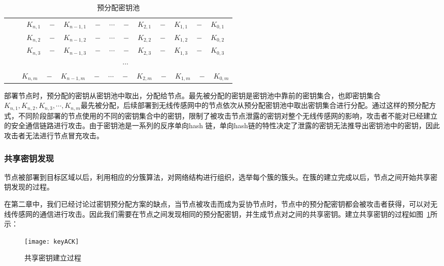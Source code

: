 \begin{table}[htb]
  \centering
  \begin{minipage}[t]{0.8\linewidth} %
  \caption[预分配密钥池]{预分配密钥池}
  \label{tab:hashline}
    \begin{tabular*}{\linewidth}{c}
      \toprule[1.5pt]
        $\quad \quad K_{n,1}\quad -\quad K_{n-1,1}\quad -\quad \cdots\quad -\quad K_{2,1}\quad -\quad K_{1,1}\quad -\quad K_{0,1}$\\
        $\quad \quad K_{n,2}\quad -\quad K_{n-1,2}\quad -\quad \cdots\quad -\quad K_{2,2}\quad -\quad K_{1,2}\quad -\quad K_{0,2}$\\
        $\quad \quad K_{n,3}\quad -\quad K_{n-1,3}\quad -\quad \cdots\quad -\quad K_{2,3}\quad -\quad K_{1,3}\quad -\quad K_{0,3}$\\
        $\quad \quad \cdots$\\
        $\quad \quad K_{n,m}\quad -\quad K_{n-1,m}\quad -\quad \cdots\quad -\quad K_{2,m}\quad -\quad K_{1,m}\quad -\quad K_{0,m}$\\
      \bottomrule[1.5pt]
    \end{tabular*}
  \end{minipage}
\end{table}

部署节点时，预分配的密钥从密钥池中取出，分配给节点。最先被分配的密钥是密钥池中靠前的密钥集合，也即密钥集合$K_{n,1},K_{n,2},K_{n,3},\cdots,K_{n,m}$最先被分配，后续部署到无线传感网中的节点依次从预分配密钥池中取出密钥集合进行分配。通过这样的预分配方式，不同阶段部署的节点使用的不同的密钥集合中的密钥，限制了被攻击节点泄露的密钥对整个无线传感网的影响，攻击者不能对已经建立的安全通信链路进行攻击。由于密钥池是一系列的反序单向hash 链，单向hash链的特性决定了泄露的密钥无法推导出密钥池中的密钥，因此攻击者无法进行节点冒充攻击。

\subsubsection{共享密钥发现}
节点被部署到目标区域以后，利用相应的分簇算法，对网络结构进行组织，选举每个簇的簇头。在簇的建立完成以后，节点之间开始共享密钥发现的过程。

在第二章中，我们已经讨论过密钥预分配方案的缺点，当节点被攻击而成为妥协节点时，节点中的预分配密钥都会被攻击者获得，可以对无线传感网的通信进行攻击。因此我们需要在节点之间发现相同的预分配密钥，并生成节点对之间的共享密钥。建立共享密钥的过程如图~\ref{fig:keyACK}所示：
\begin{figure}[htbp]
  \centering
  \texttt{[image: keyACK]}
  \caption{共享密钥建立过程}
  \label{fig:keyACK}
\end{figure}

